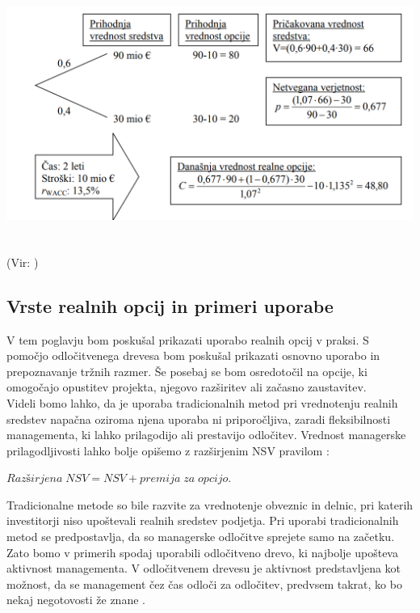 \documentclass[12pt, a4paper]{amsart}
\theoremstyle{definition} %
\theoremstyle{plain} %
\begin{document}
\includegraphics[width=15cm, height=9cm]{binomski_model}
(Vir: \cite[str. 24]{Mohar})

\subsection{Vrste realnih opcij in primeri uporabe}
V tem poglavju bom poskušal prikazati uporabo realnih opcij v praksi. S pomočjo odločitvenega drevesa bom poskušal prikazati osnovno uporabo in prepoznavanje tržnih razmer. Še posebaj se bom osredotočil na opcije, ki omogočajo opustitev projekta, njegovo razširitev ali začasno zaustavitev. \\

Videli bomo lahko, da je uporaba tradicionalnih metod pri vrednotenju realnih sredstev napačna oziroma njena uporaba ni priporočljiva, zaradi fleksibilnosti managementa, ki lahko prilagodijo ali prestavijo odločitev. Vrednost managerske prilagodljivosti lahko bolje opišemo z razširjenim NSV pravilom \cite[str. 151, 152]{Trigeorgis}:
\begin{center}
$Razširjena\;NSV = NSV + premija\;za\;opcijo$.
\end{center}
Tradicionalne metode so bile razvite za vrednotenje obveznic in delnic, pri katerih investitorji niso upoštevali realnih sredstev podjetja. Pri uporabi tradicionalnih metod se predpostavlja, da so managerske odločitve sprejete samo na začetku. Zato bomo v primerih spodaj uporabili odločitveno drevo, ki najbolje upošteva aktivnost managementa. V odločitvenem drevesu je aktivnost predstavljena kot možnost, da se management čez čas odloči za odločitev, predvsem takrat, ko bo nekaj negotovosti že znane \cite[str. 152]{Trigeorgis}. \\
\end{document}
